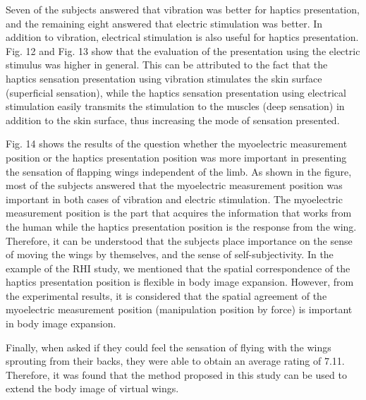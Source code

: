 \documentclass[letterpaper, 10 pt, conference]{ieeeconf}  %
\begin{document}
                Seven of the subjects answered that vibration was better for haptics presentation, and the remaining eight answered that electric stimulation was better. 
                In addition to vibration, electrical stimulation is also useful for haptics presentation. 
                Fig. 12 and Fig. 13 show that the evaluation of the presentation using the electric stimulus was higher in general. 
                This can be attributed to the fact that the haptics sensation presentation using vibration stimulates the skin surface (superficial sensation), while the haptics sensation presentation using electrical stimulation easily transmits the stimulation to the muscles (deep sensation) in addition to the skin surface, thus increasing the mode of sensation presented.

                Fig. 14 shows the results of the question whether the myoelectric measurement position or the haptics presentation position was more important in presenting the sensation of flapping wings independent of the limb. 
                As shown in the figure, most of the subjects answered that the myoelectric measurement position was important in both cases of vibration and electric stimulation.
                The myoelectric measurement position is the part that acquires the information that works from the human while the haptics presentation position is the response from the wing.
                Therefore, it can be understood that the subjects place importance on the sense of moving the wings by themselves, and the sense of self-subjectivity.
                In the example of the RHI study, we mentioned that the spatial correspondence of the haptics presentation position is flexible in body image expansion. However, from the experimental results, it is considered that the spatial agreement of the myoelectric measurement position (manipulation position by force) is important in body image expansion.

                Finally, when asked if they could feel the sensation of flying with the wings sprouting from their backs, they were able to obtain an average rating of 7.11. 
                Therefore, it was found that the method proposed in this study can be used to extend the body image of virtual wings.
\end{document}
